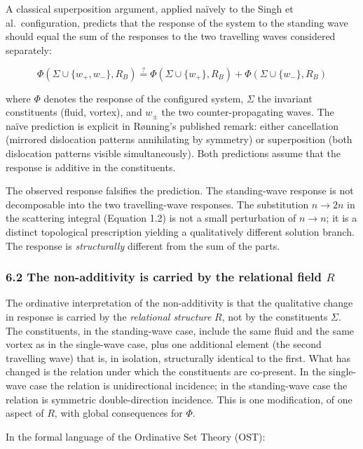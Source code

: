 \documentclass[
  11pt,
  a4paper,
]{article}
\begin{document}
A classical superposition argument, applied naïvely to the Singh et
al.~configuration, predicts that the response of the system to the
standing wave should equal the sum of the responses to the two
travelling waves considered separately:

\[ \Phi(\Sigma \cup \{w_+, w_-\}, R_B) \stackrel{?}{=} \Phi(\Sigma \cup \{w_+\}, R_B) + \Phi(\Sigma \cup \{w_-\}, R_B) \tag{6.1} \]

where \(\Phi\) denotes the response of the configured system, \(\Sigma\)
the invariant constituents (fluid, vortex), and \(w_\pm\) the two
counter-propagating waves. The naïve prediction is explicit in Rønning's
published remark: either cancellation (mirrored dislocation patterns
annihilating by symmetry) or superposition (both dislocation patterns
visible simultaneously). Both predictions assume that the response is
additive in the constituents.

The observed response falsifies the prediction. The standing-wave
response is not decomposable into the two travelling-wave responses. The
substitution \(n \to 2n\) in the scattering integral (Equation 1.2) is
not a small perturbation of \(n \to n\); it is a distinct topological
prescription yielding a qualitatively different solution branch. The
response is \emph{structurally} different from the sum of the parts.

\subsubsection{\texorpdfstring{6.2 The non-additivity is carried by the
relational field
\(R\)}{6.2 The non-additivity is carried by the relational field R}}\label{the-non-additivity-is-carried-by-the-relational-field-r}

The ordinative interpretation of the non-additivity is that the
qualitative change in response is carried by the \emph{relational
structure} \(R\), not by the constituents \(\Sigma\). The constituents,
in the standing-wave case, include the same fluid and the same vortex as
in the single-wave case, plus one additional element (the second
travelling wave) that is, in isolation, structurally identical to the
first. What has changed is the relation under which the constituents are
co-present. In the single-wave case the relation is unidirectional
incidence; in the standing-wave case the relation is symmetric
double-direction incidence. This is one modification, of one aspect of
\(R\), with global consequences for \(\Phi\).

In the formal language of the Ordinative Set Theory (OST):
\end{document}
